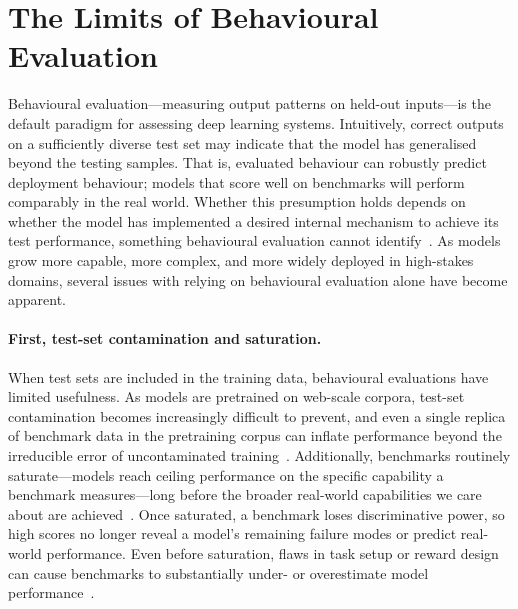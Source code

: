 \section{The Limits of Behavioural Evaluation}
\label{sec:why_open}

Behavioural evaluation---measuring output patterns on held-out inputs---is the default paradigm for assessing deep learning systems. Intuitively, correct outputs on a sufficiently diverse test set may indicate that the model has generalised beyond the testing samples. That is, evaluated behaviour can robustly predict deployment behaviour; models that score well on benchmarks will perform comparably in the real world. Whether this presumption holds depends on whether the model has implemented a desired internal mechanism to achieve its test performance, something behavioural evaluation cannot identify~. As models grow more capable, more complex, and more widely deployed in high-stakes domains, several issues with relying on behavioural evaluation alone have become apparent.

\paragraph{First, test-set contamination and saturation.} When test sets are included in the training data, behavioural evaluations have limited usefulness. As models are pretrained on web-scale corpora, test-set contamination becomes increasingly difficult to prevent, and even a single replica of benchmark data in the pretraining corpus can inflate performance beyond the irreducible error of uncontaminated training~. Additionally, benchmarks routinely saturate---models reach ceiling performance on the specific capability a benchmark measures---long before the broader real-world capabilities we care about are achieved~. Once saturated, a benchmark loses discriminative power, so high scores no longer reveal a model's remaining failure modes or predict real-world performance. Even before saturation, flaws in task setup or reward design can cause benchmarks to substantially under- or overestimate model performance~.

